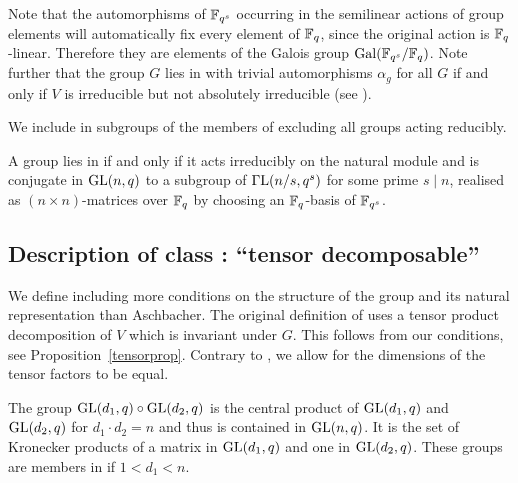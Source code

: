 Note that the automorphisms of $\mathbb{F}_{q^s}$ occurring in the semilinear
actions of group elements will automatically fix every element of $\mathbb{F}_q$, 
since the original action is $\mathbb{F}_q$-linear. Therefore they are elements of
the Galois group $\Gal(\F_{q^s}/\F_q)$. Note further that
the group $G$ lies in  
with trivial automorphisms $\alpha_g$ for all $G$ if and only if
$V$ is irreducible but not absolutely irreducible (see \cite[(29.13)]{CR0}).

\medskip
{}
We include in  subgroups of the members of  excluding all
groups acting reducibly.

\smallskip
\stru
A group lies in  if and only if it acts irreducibly on the natural
module and is conjugate in $\GL(n,q)$ to a subgroup of $\GGL(n/s,q^s)$ for
some prime $s \mid n$, realised as $(n \times n)$-matrices over $\mathbb{F}_q$
by choosing an $\mathbb{F}_q$-basis of $\mathbb{F}_{q^s}$.


\subsection{Description of class : ``tensor decomposable''}
\label{descD4}
%
%


We define  including more conditions on the structure of the
group and its natural representation than Aschbacher. The original
definition of  uses a tensor product decomposition of $V$
which is invariant under $G$.
This follows from our conditions, see Proposition~\ref{tensorprop}. 
Contrary to , we allow for  the dimensions of the tensor factors 
to be equal.

\smallskip
\exmemb
The group $\GL(d_1,q) \circ \GL(d_2,q)$ is the central
product of $\GL(d_1,q)$ and $\GL(d_2,q)$ for $d_1 \cdot d_2 = n$ and
thus is contained in $\GL(n,q)$. It is
the set of Kronecker products of a matrix in $\GL(d_1,q)$ and one in
$\GL(d_2,q)$. These groups are members in  if $1 < d_1 < n$.


